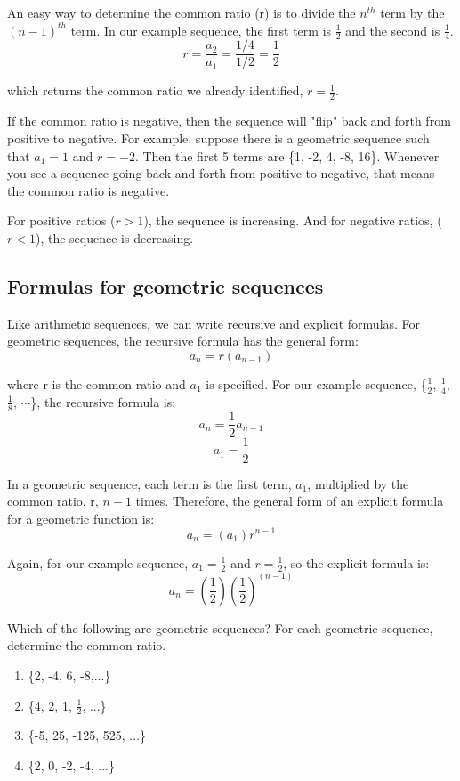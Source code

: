 An easy way to determine the common ratio (r) is to divide the 
$n^{th}$ term by the $(n-1)^{th}$ term. In our example sequence, 
the first term is $\frac{1}{2}$ and the second is $\frac{1}{4}$. 
$$r = \frac{a_2}{a_1} = \frac{1/4}{1/2} = \frac{1}{2}$$

which returns the common ratio we already identified, $r= \frac{1}{2}$. 

If the common ratio is negative, then the sequence will "flip" back 
and forth from positive to negative. For example, suppose there is a 
geometric sequence such that $a_1 = 1$ and $r = -2$. Then the first 5 
terms are \{1, -2, 4, -8, 16\}. Whenever you see a sequence going 
back and forth from positive to negative, that means the common ratio 
is negative. 

For positive ratios ($r>1$), the sequence is increasing. 
And for negative ratios, ($r<1$), the sequence is decreasing. 

\subsection{Formulas for geometric sequences}
Like arithmetic sequences, we can write recursive and explicit 
formulas. For geometric sequences, the recursive formula has the 
general form: 
$$a_n = r(a_{n-1})$$

where r is the common ratio and $a_1$ is specified. For our example 
sequence, \{$\frac{1}{2}$, $\frac{1}{4}$, $\frac{1}{8}$, $\cdots$\}, 
the recursive formula is:
$$a_n = \frac{1}{2}a_{n-1}$$
$$a_1 = \frac{1}{2}$$

In a geometric sequence, each term is the first term, $a_1$, 
multiplied by the common ratio, r, $n-1$ times. Therefore, the 
general form of an explicit formula for a geometric function is:
$$a_n = (a_1)r^{n-1}$$

Again, for our example sequence, $a_1 = \frac{1}{2}$ and $r = 
\frac{1}{2}$, so the explicit formula is:
$$a_n = (\frac{1}{2})(\frac{1}{2})^{(n-1)}$$

\begin{Exercise}[label=seq4]
Which of the following are geometric sequences? For each geometric 
sequence, determine the common ratio.
\begin{enumerate}
\item \{2, -4, 6, -8,...\}
\item \{4, 2, 1, $\frac{1}{2}$, ...\}
\item \{-5, 25, -125, 525, ...\}
\item \{2, 0, -2, -4, ...\}
\end{enumerate}
\end{Exercise}

